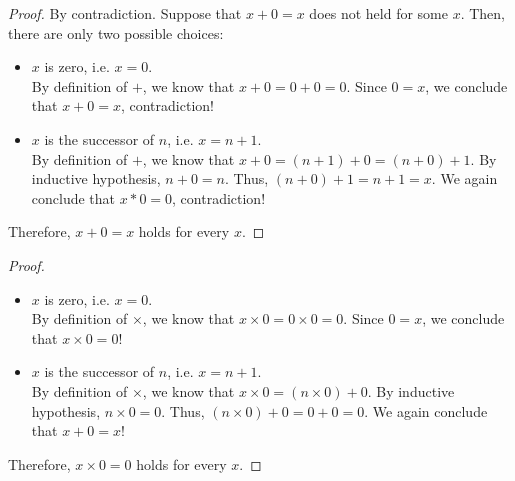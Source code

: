 \documentclass[11pt,a4paper]{article}
\begin{document}
\begin{proof}
  By contradiction. Suppose that $x + 0 = x$ does not held for some $x$. Then, there are only two possible choices:
  \begin{itemize}
    \item $x$ is zero, i.e. $x = 0$. \\By definition of $+$, we know that $x + 0 = 0 + 0 = 0$. 
    Since $0 = x$, we conclude that $x + 0 = x$, contradiction!
    \item $x$ is the successor of $n$, i.e. $x = n + 1$. \\By definition of $+$, we know that $x + 0 = (n + 1) + 0 = (n + 0) + 1$. 
    By inductive hypothesis, $n + 0 = n$. Thus, $(n + 0) + 1 = n + 1 = x$. We again conclude that $x * 0 = 0$, contradiction!
  \end{itemize}
  Therefore, $x + 0 = x$ holds for every $x$.
\end{proof}


\begin{proof}
    \begin{itemize}
      \item $x$ is zero, i.e. $x = 0$.\\ By definition of $\times$, we know that $x \times 0 = 0 \times 0 = 0$. 
      Since $0 = x$, we conclude that $x \times 0 = 0$!
      \item $x$ is the successor of $n$, i.e. $x = n + 1$. \\By definition of $\times$, we know that $x \times 0 = (n \times 0) + 0$. 
      By inductive hypothesis, $n \times 0 = 0$. Thus, $(n \times 0) + 0 = 0 + 0 = 0$. We again conclude that $x + 0 = x$!
    \end{itemize}
    Therefore, $x \times 0 = 0$ holds for every $x$.
\end{proof}

\end{document}
